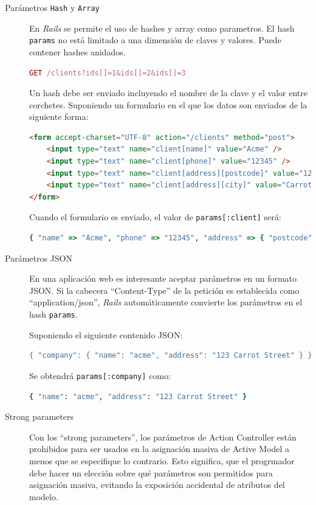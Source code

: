 \begin{description}
	\item[Parámetros \texttt{Hash} y \texttt{Array}] En \textit{Rails} se permite el uso de hashes y array como parametros. El hash \texttt{params} no está limitado a una dimensión de claves y valores. Puede contener hashes anidados.
\begin{lstlisting}[language=Ruby]
GET /clients?ids[]=1&ids[]=2&ids[]=3
\end{lstlisting}	
	
	Un hash debe ser enviado incluyendo el nombre de la clave y el valor entre corchetes. Suponiendo un formulario en el que los datos son enviados de la siguiente forma:
	
\begin{lstlisting}[language=HTML]
<form accept-charset="UTF-8" action="/clients" method="post">
	<input type="text" name="client[name]" value="Acme" />
  	<input type="text" name="client[phone]" value="12345" />
  	<input type="text" name="client[address][postcode]" value="12345" />
  	<input type="text" name="client[address][city]" value="Carrot City" />
</form>
\end{lstlisting}
	
	Cuando el formulario es enviado, el valor de \texttt{params[:client]} será:
\begin{lstlisting}[language=Ruby]
{ "name" => "Acme", "phone" => "12345", "address" => { "postcode" => "12345", "city" => "Carrot City" } }
\end{lstlisting}
	
	\item[Parámetros JSON] En una aplicación web es interesante aceptar parámetros en un formato JSON. Si la cabecera ``Content-Type'' de la petición es establecida como ``application/json'', \textit{Rails} automáticamente convierte los parámetros en el hash \texttt{params}.
	
	Suponiendo el siguiente contenido JSON:
\begin{lstlisting}[language=Java]
{ "company": { "name": "acme", "address": "123 Carrot Street" } }
\end{lstlisting}

	Se obtendrá \texttt{params[:company]} como:
\begin{lstlisting}[language=Ruby]
{ "name": "acme", "address": "123 Carrot Street" }	
\end{lstlisting}

	\item[Strong parameters] Con los ``strong parameters'', los parámetros de Action Controller están prohibidos para ser usados en la asignación masiva de Active Model a menos que se especifique lo contrario. Esto significa, que el progrmador debe hacer un elección sobre qué parámetros son permitidos para asignación masiva, evitando la exposición accidental de atributos del modelo.
	

\end{description}
